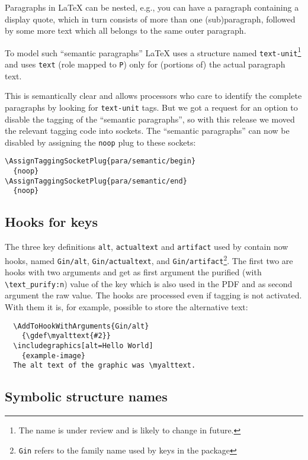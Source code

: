 \documentclass{ltnews}
\begin{document}
Paragraphs in \LaTeX{} can be nested, e.g., you can have a paragraph
containing a display quote, which in turn consists of more than one
(sub)paragraph, followed by some more text which all belongs to the
same outer paragraph.

To model such \enquote{semantic paragraphs} \LaTeX{} uses a structure
named \texttt{text-unit}\footnote{The name is under review and is
likely to change in future.}  and uses \texttt{text} (role mapped to
\texttt{P}) only for (portions of) the actual paragraph text.

This is semantically clear and allows processors who care to identify
the complete paragraphs by looking for \texttt{text-unit} tags.  But
we got a request for an option to disable the tagging of the
\enquote{semantic paragraphs}, so with this release we moved the
relevant tagging code into sockets. The \enquote{semantic paragraphs}
can now be disabled by assigning the \texttt{noop} plug to these
sockets:
\begin{verbatim}
\AssignTaggingSocketPlug{para/semantic/begin}
  {noop}
\AssignTaggingSocketPlug{para/semantic/end}
  {noop}
\end{verbatim}

\subsection{Hooks for  keys}

The three key definitions \texttt{alt}, \texttt{actualtext} and
\texttt{artifact} used by  contain now hooks,
named \texttt{Gin/alt}, \texttt{Gin/actualtext}, and
\texttt{Gin/artifact}\footnote{\texttt{Gin} refers to the family name
used by keys in the  package}.  The first two are hooks
with two arguments and get as first argument the purified (with
\verb+\text_purify:n+) value of the key which is also used in
the PDF and as second argument the raw value.  The hooks are processed
even if tagging is not activated.  With them it is, for example,
possible to store the alternative text:
\begin{verbatim}
  \AddToHookWithArguments{Gin/alt}
    {\gdef\myalttext{#2}}
  \includegraphics[alt=Hello World]
    {example-image}
  The alt text of the graphic was \myalttext.
\end{verbatim}


\subsection{Symbolic structure names}
\end{document}
